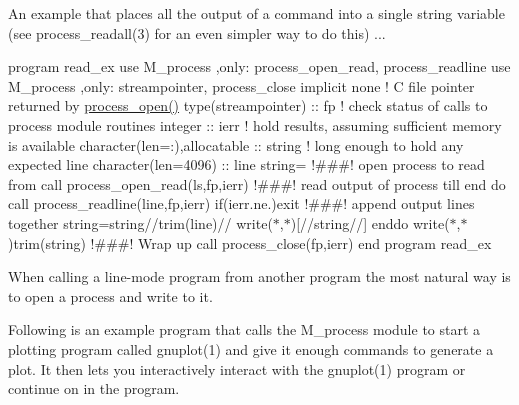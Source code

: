 An example that places all the output of a command into a single string variable (see process\+\_\+readall(3) for an even simpler way to do this) ...

program read\+\_\+ex use M\+\_\+process ,only\+: process\+\_\+open\+\_\+read, process\+\_\+readline use M\+\_\+process ,only\+: streampointer, process\+\_\+close implicit none ! C file pointer returned by \mbox{\hyperlink{namespacem__process_a3c0f543a9ceff2671041d73660f60a59}{process\+\_\+open()}} type(streampointer) \+:\+: fp ! check status of calls to process module routines integer \+:\+: ierr ! hold results, assuming sufficient memory is available character(len=\+:),allocatable \+:\+: string ! long enough to hold any expected line character(len=4096) \+:\+: line string=\textquotesingle{}\textquotesingle{} !\#\#\#! open process to read from call process\+\_\+open\+\_\+read(\textquotesingle{}ls\textquotesingle{},fp,ierr) !\#\#\#! read output of process till end do call process\+\_\+readline(line,fp,ierr) if(ierr.\+ne.)exit !\#\#\#! append output lines together string=string//trim(line)//\textquotesingle{} \textquotesingle{} write($\ast$,$\ast$)\textquotesingle{}\mbox{[}\textquotesingle{}//string//\textquotesingle{}\mbox{]}\textquotesingle{} enddo write($\ast$,$\ast$)trim(string) !\#\#\#! Wrap up call process\+\_\+close(fp,ierr) end program read\+\_\+ex

When calling a line-\/mode program from another program the most natural way is to open a process and write to it.

Following is an example program that calls the M\+\_\+process module to start a plotting program called gnuplot(1) and give it enough commands to generate a plot. It then lets you interactively interact with the gnuplot(1) program or continue on in the program.

